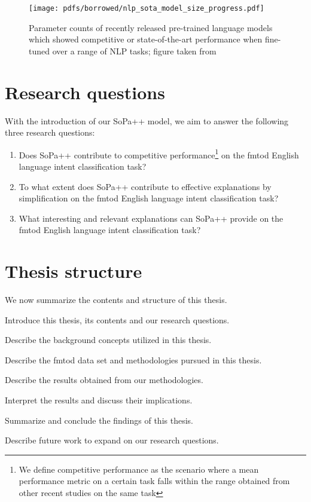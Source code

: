 \begin{figure}[th]
  \centering
  \texttt{[image: pdfs/borrowed/nlp\_sota\_model\_size\_progress.pdf]}
  \caption{Parameter counts of recently released pre-trained language models
    which showed competitive or state-of-the-art performance when fine-tuned
    over a range of NLP tasks; figure taken from \citet{sanh2019distilbert}}
  \label{fig:nlp_progress}
\end{figure}

\section{Research questions}

\label{section:rq}

With the introduction of our SoPa++ model, we aim to answer the following three
research questions:

\begin{enumerate}
  \item Does SoPa++ contribute to competitive performance\footnote{We define
    competitive performance as the scenario where a mean performance metric on a
    certain task falls within the range obtained from other recent studies on
    the same task} on the \ac{fmtod} English language intent classification task?
  \item To what extent does SoPa++ contribute to effective explanations by
  simplification on the \ac{fmtod} English language intent classification task?
  \item What interesting and relevant explanations can SoPa++ provide on the
  \ac{fmtod} English language intent classification task?
\end{enumerate}

\section{Thesis structure}

We now summarize the contents and structure of this thesis.

\begin{description}[align=left]
  \item [Chapter \ref{chapter:introduction}:] Introduce this thesis, its
  contents and our research questions.
  \item [Chapter \ref{chapter:background}:] Describe the background concepts
  utilized in this thesis.
  \item [Chapter \ref{chapter:methodologies}:] Describe the \ac{fmtod} data set and
  methodologies pursued in this thesis.
  \item [Chapter \ref{chapter:results}:] Describe the results obtained from our
  methodologies.
  \item [Chapter \ref{chapter:discussion}:] Interpret the results and discuss their
  implications.
  \item [Chapter \ref{chapter:conclusions}:] Summarize and conclude the findings
  of this thesis.
  \item [Chapter \ref{chapter:further_work}:] Describe future work to expand on
  our research questions.
\end{description}

